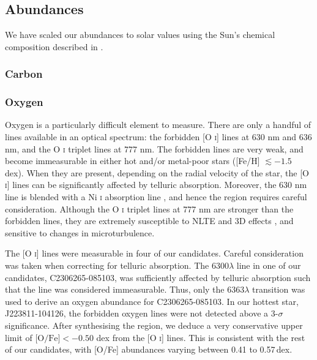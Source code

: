 \documentclass{emulateapj}
\begin{document}


\subsection{Abundances}
We have scaled our abundances to solar values using the Sun's chemical composition described in \citet{asplund;et-al_2009}.

\subsubsection{Carbon}

\subsubsection{Oxygen}
\label{sec:oxygen-abundances}
Oxygen is a particularly difficult element to measure. There are only a handful of lines available in an optical spectrum: the forbidden [O \textsc{i}] lines at 630 nm and 636 nm, and the O \textsc{i} triplet lines at 777 nm. The forbidden lines are very weak, and become immeasurable in either hot and/or metal-poor stars ([Fe/H] $\lesssim -1.5$ dex). When they are present, depending on the radial velocity of the star, the [O \textsc{i}] lines can be significantly affected by telluric absorption. Moreover, the 630 nm line is blended with a Ni \textsc{i} absorption line \citep{allende-prieto;et-al_2001}, and hence the region requires careful consideration. Although the O \textsc{i} triplet lines at 777 nm are stronger than the forbidden lines, they are extremely susceptible to NLTE and 3D effects \citep{asplund;perez_2001}, and sensitive to changes in microturbulence. 

The [O \textsc{i}] lines were measurable in four of our candidates. Careful consideration was taken when correcting for telluric absorption. The 6300$\lambda$ line in one of our candidates, C2306265-085103, was sufficiently affected by telluric absorption such that the line was considered immeasurable. Thus, only the 6363$\lambda$ transition was used to derive an oxygen abundance for C2306265-085103. In our hottest star, J223811-104126, the forbidden oxygen lines were not detected above a 3-$\sigma$ significance. After synthesising the region, we deduce a very conservative upper limit of $\mbox{[O/Fe]} < -0.50$ dex from the [O \textsc{i}] lines. This is consistent with the rest of our candidates, with [O/Fe] abundances varying between 0.41 to 0.57\,dex.
\end{document}
